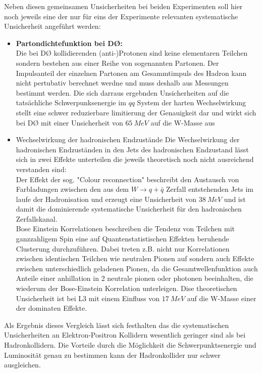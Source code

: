 \documentclass[a4paper,12pt]{article}
\begin{document}
Neben diesen gemeinsamen Unsicherheiten bei beiden Experimenten soll hier noch jeweils eine der nur für eins der Experimente relevanten
systematische Unsicherheit angeführt werden:
\begin{itemize}
	\item \textbf{Partondichtefunktion bei DØ:}\\
	Die bei DØ kollidierenden (anti-)Protonen sind keine elementaren Teilchen sondern bestehen aus einer Reihe von sogenannten Partonen. Der
	Impulsanteil der einzelnen Partonen am Gesammtimpuls des Hadron kann nicht pertubativ berechnet werdne und muss deshalb aus Messungen bestimmt
	werden. Die sich darraus ergebnden Unsicherheiten auf die tatsächliche Schwerpunksenergie im $qq$ System der harten Wechselwirkung stellt eine
	schwer reduzierbare limitierung der Genauigkeit dar und wirkt sich bei DØ mit einer Unsicherheit von $\SI{65}{MeV}$ auf die W-Masse aus
	\item {Wechselwirkung der hadronischen Endzustände}
	Die Wechselwirkung der hadronischen Endzuständen in den Jets des hadronischen Endzustand lässt sich in zwei Effekte unterteilen die jeweils
	theoretisch noch nicht ausreichend verstanden sind: \\
	Der Effekt der sog. "Colour reconnection" beschreibt den Austausch von Farbladungen zwischen
	den aus dem $W\rightarrow q+\bar{q}$ Zerfall entstehenden Jets im laufe der Hadronisation und erzeugt eine Unsicherheit von $\SI{38}{MeV}$
	und ist damit die dominierende systematische Unsicherheit für den hadronischen Zerfallskanal.\\
	Bose Einstein Korrelationen beschreiben die Tendenz von Teilchen mit ganzzahligem Spin eine auf Quantenstatistischen Effekten beruhende Clusterung
	durchzuführen. Dabei treten z.B. nicht nur Korrelationen zwischen identischen Teilchen wie neutralen Pionen auf sondern auch Effekte zwischen
	unterschiedlich geladenen Pionen, da die Gesamtwellenfunktion auch Anteile einer anhillation in 2 neutrale pionen oder photonen beeinhalten, die 
	wiederum der Bose-Einstein Korrelation unterleigen. Dise theoretischen Unsicherheit ist bei L3 mit einem Einfluss von $\SI{17}{MeV}$ auf die W-Masse
	einer der dominaten Effekte.
\end{itemize} 
Als Ergebnis dieses Vergleich lässt sich festhalten das die systematischen Unsicherheiten an Elektron-Positron Kollidern wesentlich geringer sind als 
bei Hadronkollidern. Die Vorteile durch die Möglichkeit die Schwerpunktsenergie und Luminosität genau zu bestimmen kann der Hadronkollider nur schwer ausgleichen.


{}
\end{document}
